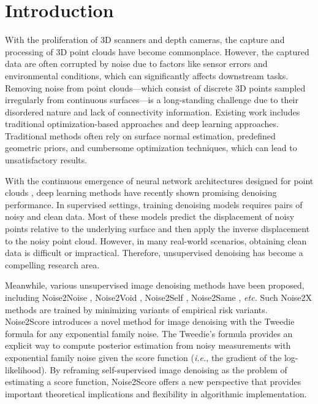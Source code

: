 \section{Introduction}
\label{sec:intro}

With the proliferation of 3D scanners and depth cameras, the capture and processing of 3D point clouds have become commonplace. However, the captured data are often corrupted by noise due to factors like sensor errors and environmental conditions, which can significantly affects downstream tasks.
Removing noise from point clouds—which consist of discrete 3D points sampled irregularly from continuous surfaces—is a long-standing challenge due to their disordered nature and lack of connectivity information. Existing work includes traditional optimization-based approaches and deep learning approaches. Traditional methods often rely on surface normal estimation, predefined geometric priors, and cumbersome optimization techniques, which can lead to unsatisfactory results.

With the continuous emergence of neural network architectures designed for point clouds \cite{qi2017pointnet,qi2017pointnet2,KPconv,wang2019dynamic}, deep learning methods have recently shown promising denoising performance. 
In supervised settings, training denoising models requires pairs of noisy and clean data. Most of these models predict the displacement of noisy points relative to the underlying surface and then apply the inverse displacement to the noisy point cloud. However, in many real-world scenarios, obtaining clean data is difficult or  impractical. Therefore, unsupervised denoising has become a compelling research area.

Meanwhile, various unsupervised image denoising methods have been proposed, including Noise2Noise \cite{2018Noise2NoiseLI}, Noise2Void \cite{2018Noise2VoidL}, Noise2Self \cite{2019Noise2SelfBD}, Noise2Same \cite{Xie2020Noise2SameOA}, \textit{etc.} Such Noise2X methods are trained by minimizing variants of empirical risk variants.
Noise2Score \cite{kim_noise2score_2021} introduces a novel method for image denoising with the Tweedie formula for any exponential family noise. The Tweedie's formula \cite{efron2011tweedie} provides an explicit way to compute  posterior estimation from noisy measurements with exponential family noise given the score function (\textit{i.e.}, the gradient of the log-likelihood).
By reframing self-supervised image denoising as the problem of estimating a score function, Noise2Score offers a new perspective that provides important theoretical implications and flexibility in algorithmic implementation. 

